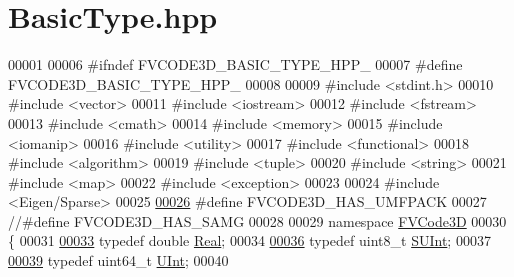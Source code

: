 \hypertarget{BasicType_8hpp_source}{}\section{Basic\+Type.\+hpp}
\label{BasicType_8hpp_source}

\begin{DoxyCode}
00001 
00006 \textcolor{preprocessor}{#ifndef FVCODE3D\_BASIC\_TYPE\_HPP\_}
00007 \textcolor{preprocessor}{#define FVCODE3D\_BASIC\_TYPE\_HPP\_}
00008 
00009 \textcolor{preprocessor}{#include <stdint.h>}
00010 \textcolor{preprocessor}{#include <vector>}
00011 \textcolor{preprocessor}{#include <iostream>}
00012 \textcolor{preprocessor}{#include <fstream>}
00013 \textcolor{preprocessor}{#include <cmath>}
00014 \textcolor{preprocessor}{#include <memory>}
00015 \textcolor{preprocessor}{#include <iomanip>}
00016 \textcolor{preprocessor}{#include <utility>}
00017 \textcolor{preprocessor}{#include <functional>}
00018 \textcolor{preprocessor}{#include <algorithm>}
00019 \textcolor{preprocessor}{#include <tuple>}
00020 \textcolor{preprocessor}{#include <string>}
00021 \textcolor{preprocessor}{#include <map>}
00022 \textcolor{preprocessor}{#include <exception>}
00023 
00024 \textcolor{preprocessor}{#include <Eigen/Sparse>}
00025 
\hypertarget{BasicType_8hpp_source.tex_l00026}{}\hyperlink{BasicType_8hpp_a496de83e4324634a1cd0b2ea3f29bafc}{00026} \textcolor{preprocessor}{#define FVCODE3D\_HAS\_UMFPACK}
00027 \textcolor{comment}{//#define FVCODE3D\_HAS\_SAMG}
00028 
00029 \textcolor{keyword}{namespace }\hyperlink{namespaceFVCode3D}{FVCode3D}
00030 \{
00031 
\hypertarget{BasicType_8hpp_source.tex_l00033}{}\hyperlink{namespaceFVCode3D_a40c1f5588a248569d80aa5f867080e83}{00033} \textcolor{keyword}{typedef} \textcolor{keywordtype}{double} \hyperlink{namespaceFVCode3D_a40c1f5588a248569d80aa5f867080e83}{Real};
00034 
\hypertarget{BasicType_8hpp_source.tex_l00036}{}\hyperlink{namespaceFVCode3D_a0319e74922d1d700fbc06e470e0cfc07}{00036} \textcolor{keyword}{typedef} uint8\_t \hyperlink{namespaceFVCode3D_a0319e74922d1d700fbc06e470e0cfc07}{SUInt};
00037 
\hypertarget{BasicType_8hpp_source.tex_l00039}{}\hyperlink{namespaceFVCode3D_a4bf7e328c75d0fd504050d040ebe9eda}{00039} \textcolor{keyword}{typedef} uint64\_t \hyperlink{namespaceFVCode3D_a4bf7e328c75d0fd504050d040ebe9eda}{UInt};
00040 

\end{DoxyCode}

